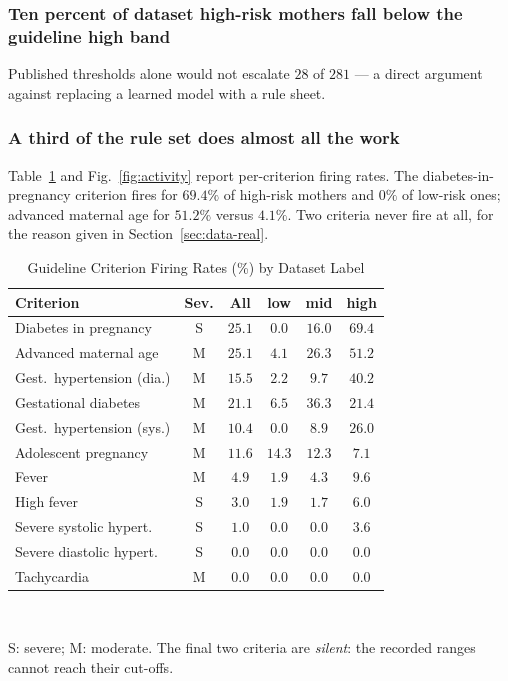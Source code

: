 \documentclass[journal]{IEEEtran}
\newcommand{\hdr}[1]{\textbf{#1}}
\begin{document}
\subsubsection{Ten percent of dataset high-risk mothers fall below the guideline
high band}
Published thresholds alone would not escalate $28$ of $281$ --- a direct
argument against replacing a learned model with a rule sheet.

\subsubsection{A third of the rule set does almost all the work}
Table~\ref{tab:activity} and Fig.~\ref{fig:activity} report per-criterion firing
rates. The diabetes-in-pregnancy criterion fires for $69.4\%$ of high-risk
mothers and $0\%$ of low-risk ones; advanced maternal age for $51.2\%$ versus
$4.1\%$. Two criteria never fire at all, for the reason given in
Section~\ref{sec:data-real}.

\begin{table}[!t]
\renewcommand{\arraystretch}{1.2}
\caption{Guideline Criterion Firing Rates (\%) by Dataset Label}
\label{tab:activity}
\centering
\footnotesize
\begin{tabular}{@{}lccccc@{}}
\toprule
\hdr{Criterion} & \hdr{Sev.} & \hdr{All} & \hdr{low} & \hdr{mid} & \hdr{high} \\
\midrule
Diabetes in pregnancy      & S & $25.1$ & $0.0$  & $16.0$ & $69.4$ \\
Advanced maternal age      & M & $25.1$ & $4.1$  & $26.3$ & $51.2$ \\
Gest.\ hypertension (dia.) & M & $15.5$ & $2.2$  & $9.7$  & $40.2$ \\
Gestational diabetes       & M & $21.1$ & $6.5$  & $36.3$ & $21.4$ \\
Gest.\ hypertension (sys.) & M & $10.4$ & $0.0$  & $8.9$  & $26.0$ \\
Adolescent pregnancy       & M & $11.6$ & $14.3$ & $12.3$ & $7.1$  \\
Fever                      & M & $4.9$  & $1.9$  & $4.3$  & $9.6$  \\
High fever                 & S & $3.0$  & $1.9$  & $1.7$  & $6.0$  \\
Severe systolic hypert.    & S & $1.0$  & $0.0$  & $0.0$  & $3.6$  \\
Severe diastolic hypert.   & S & $0.0$  & $0.0$  & $0.0$  & $0.0$  \\
Tachycardia                & M & $0.0$  & $0.0$  & $0.0$  & $0.0$  \\
\bottomrule
\end{tabular}
\\[2pt]
\raggedright\footnotesize S: severe; M: moderate. The final two criteria are
\emph{silent}: the recorded ranges cannot reach their cut-offs.
\end{table}
\end{document}
